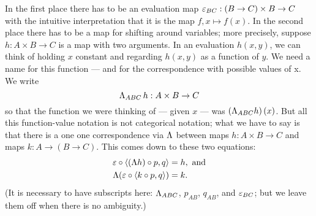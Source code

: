 In the first place there has to be an evaluation map
$\varepsilon_{BC} : (B \rightarrow C) \times B \rightarrow C$ with the intuitive interpretation that it is the map $ f,x \mapsto f(x)$. In the second place there has to be a map for shifting around variables; more precisely, suppose
$h: A\times B \to C$ is a map with two arguments. In an evaluation $h(x,y)$, we can think of holding $x$ constant and regarding $h(x,y)$ as a function of $y$. We need a name for this function --- and for the correspondence with possible values of x. We write
$$
\Lambda_{ABC}\, h : A\times B \rightarrow C
$$
%
so that the function we were thinking of --- given $x$ --- was
$(\Lambda_{ABC} h)\, (x)$. But all this function-value notation is not categorical notation; what we have to say is that there is a one one correspondence via $\Lambda$ between maps $h : A\times B \to C$ and maps $k: A \to (B \to C)$. This comes down to these two equations:
%
\begin{align*}
\varepsilon \circ \langle (\Lambda h)\circ p, q\rangle &= h, {\textrm{ and}} \\
\Lambda(\varepsilon \circ \langle k \circ p, q \rangle) &= k.
\end{align*}
%
(It is necessary to have subscripts here: $\Lambda_{ABC}$, $p_{AB}$, $q_{AB}$, and $\varepsilon_{BC}$; but we leave them off when there is no ambiguity.)

